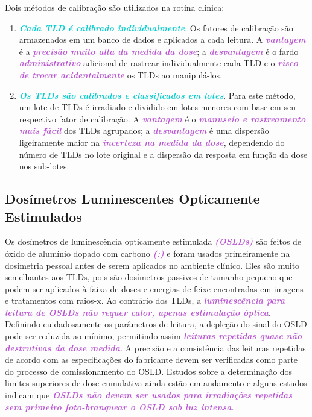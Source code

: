 \documentclass[11pt,a4paper]{article}
\begin{document}
	Dois métodos de calibração são utilizados na rotina clínica:

	\begin{enumerate}
		\item \textcolor{DarkTurquoise}{\textbf{\textit{Cada TLD é calibrado individualmente}}}. Os fatores de calibração são armazenados em um banco de dados e aplicados a cada leitura. A \textcolor{MediumOrchid}{\textbf{\textit{vantagem}}} é a \textcolor{MediumOrchid}{\textbf{\textit{precisão muito alta da medida da dose}}}; a \textcolor{MediumOrchid}{\textbf{\textit{desvantagem}}} é o fardo \textcolor{MediumOrchid}{\textbf{\textit{administrativo}}} adicional de rastrear individualmente cada TLD e o \textcolor{MediumOrchid}{\textbf{\textit{risco de trocar acidentalmente}}} os TLDs ao manipulá-los.
		\item \textcolor{DarkTurquoise}{\textbf{\textit{Os TLDs são calibrados e classificados em lotes}}}. Para este método, um lote de TLDs é irradiado e dividido em lotes menores com base em seu respectivo fator de calibração. A \textcolor{MediumOrchid}{\textbf{\textit{vantagem}}} é o \textcolor{MediumOrchid}{\textbf{\textit{manuseio e rastreamento mais fácil}}} dos TLDs agrupados; a \textcolor{MediumOrchid}{\textbf{\textit{desvantagem}}} é uma dispersão ligeiramente maior na \textcolor{MediumOrchid}{\textbf{\textit{incerteza na medida da dose}}}, dependendo do número de TLDs no lote original e a dispersão da resposta em função da dose nos sub-lotes.
	\end{enumerate}

\subsection*{Dosímetros Luminescentes Opticamente Estimulados}

	Os dosímetros de luminescência opticamente estimulada \textcolor{MediumOrchid}{\textbf{\textit{(OSLDs)}}} são feitos de óxido de alumínio dopado com carbono \textcolor{MediumOrchid}{\textbf{\textit{(:)}}} e foram usados primeiramente na dosimetria pessoal antes de serem aplicados no ambiente clínico. Eles são muito semelhantes aos TLDs, pois são dosímetros passivos de tamanho pequeno que podem ser aplicados à faixa de doses e energias de feixe encontradas em imagens e tratamentos com raios-x. Ao contrário dos TLDs, a \textcolor{MediumOrchid}{\textbf{\textit{luminescência para leitura de OSLDs não requer calor, apenas estimulação óptica}}}. Definindo cuidadosamente os parâmetros de leitura, a depleção do sinal do OSLD pode ser reduzida ao mínimo, permitindo assim \textcolor{MediumOrchid}{\textbf{\textit{leituras repetidas quase não destrutivas da dose medida}}}. A precisão e a consistência das leituras repetidas de acordo com as especificações do fabricante devem ser verificadas como parte do processo de comissionamento do OSLD. Estudos sobre a determinação dos limites superiores de dose cumulativa ainda estão em andamento e alguns estudos indicam que \textcolor{MediumOrchid}{\textbf{\textit{OSLDs não devem ser usados para irradiações repetidas sem primeiro foto-branquear o OSLD sob luz intensa}}}.
\end{document}
